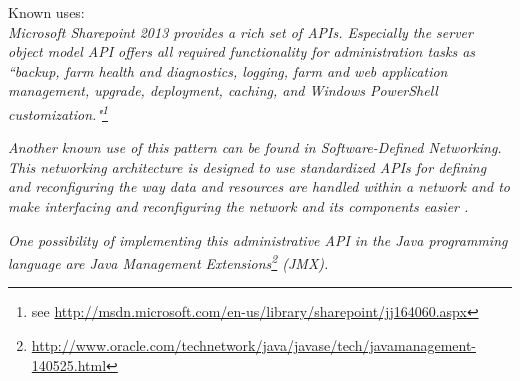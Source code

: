 
Known uses:\\
\textit{Microsoft Sharepoint 2013 provides a rich set of APIs. Especially the server object model API offers all required functionality for administration tasks as ``backup, farm health and diagnostics, logging, farm and web application management, upgrade, deployment, caching, and Windows PowerShell customization."\footnote{see \url{http://msdn.microsoft.com/en-us/library/sharepoint/jj164060.aspx}}}

\textit{Another known use of this pattern can be found in Software-Defined Networking. This networking architecture is designed to use standardized APIs for defining and reconfiguring the way data and resources are handled within a network and to make interfacing and reconfiguring the network and its components easier \cite{Kirkpatrick2013}.}

\textit{One possibility of implementing this administrative API in the Java programming language are Java Management Extensions\footnote{\url{http://www.oracle.com/technetwork/java/javase/tech/javamanagement-140525.html}} (JMX). }

%
%
%
